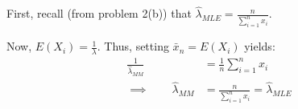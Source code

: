 \documentclass[paper=a4, fontsize=11pt]{scrartcl} %
\numberwithin{equation}{section} %
\numberwithin{figure}{section} %
\numberwithin{table}{section} %
\begin{document}
First, recall (from problem 2(b)) that $\hat{\lambda}_{MLE} =\frac{n}{\sum_{i = 1}^{n}x_i}$.

Now, $E(X_i) = \frac{1}{\lambda}$. Thus, setting $\bar{x}_n = E(X_i)$ yields:
\begin{align*}
\frac{1}{\hat{\lambda}_{MM}} &= \frac{1}{n} \sum_{i = 1}^{n}x_i \\
   \implies \qquad{} \hat{\lambda}_{MM} &= \frac{n}{\sum_{i = 1}^{n}x_i} = \hat{\lambda}_{MLE}
\end{align*}

\end{document}
